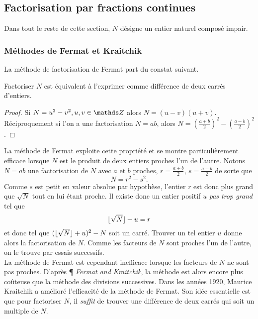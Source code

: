 \subsection{Factorisation par fractions continues}

Dans tout le reste de cette section, $N$ désigne un entier naturel composé impair.

\subsubsection{Méthodes de Fermat et Kraitchik}

La méthode de factorisation de Fermat part du constat suivant.

\begin{lemme}
	Factoriser $N$ est équivalent à l'exprimer comme différence de deux carrés
	d'entiers.
\end{lemme}

\begin{proof}
	Si $N = u^2 - v^2, u, v\in \Z$ alors $N = (u-v)(u + v)$. Réciproquement si
	l'on a une factorisation $N = ab$, alors $N = \left(\frac{a+b}{2}\right)^2
	- \left(\frac{a-b}{2}\right)^2$.
\end{proof}

La méthode de Fermat exploite cette propriété et se montre particulièrement
efficace lorsque $N$ est le produit de deux entiers proches l'un de l'autre.
Notons $N=ab$ une factorisation de $N$ avec $a$ et $b$ proches, $r=\frac{a+b}{2}$,
$s=\frac{a-b}{2}$ de sorte que \[N = r^2 - s^2.\] Comme $s$ est petit en valeur
absolue par hypothèse, l'entier $r$ est donc plus grand que $\sqrt{N}$ tout en
lui étant proche. Il existe donc un entier positif $u$ \emph{pas trop grand} tel
que \[\lfloor\sqrt{N}\rfloor + u = r\] et donc tel que $(\lfloor\sqrt{N}\rfloor + u)^2 - N$ soit
un carré. Trouver un tel entier $u$ donne alors la factorisation de $N$. Comme 
les facteurs de $N$ sont proches l'un de l'autre, on le trouve par essais 
successifs. \\

La méthode de Fermat est cependant inefficace lorsque les facteurs de $N$ ne
sont pas proches. D'après \cite{Tale} ¶ \emph{Fermat and Kraitchik}, la méthode
est alors encore plus coûteuse que la méthode des divisions successives. Dans
les années 1920, Maurice Kraitchik a amélioré l'efficacité de la méthode de
Fermat. Son idée essentielle est que pour factoriser $N$, il \emph{suffit} de
trouver une différence de deux carrés qui soit un multiple de $N$.


